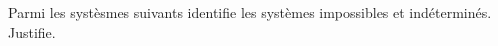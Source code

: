 %
%
    Parmi les systèsmes suivants identifie les systèmes impossibles et indéterminés. Justifie.
    \begin{tasks}
        \task {}
        \task {}
        \task {}
        \task {}
    \end{tasks}
